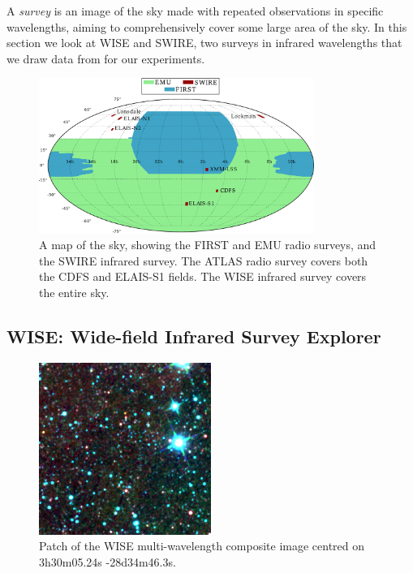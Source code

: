         A \emph{survey} is an image of the sky made with repeated observations
        in specific wavelengths, aiming to comprehensively cover some large area
        of the sky. In this section we look at WISE and SWIRE, two surveys in
        infrared wavelengths that we draw data from for our experiments.

        \begin{figure}
            \centering
            \includegraphics[width=0.8\textwidth]{images/skymap2.pdf}
            \caption{A map of the sky, showing the FIRST and EMU radio surveys,
                and the SWIRE infrared survey. The ATLAS radio survey
                covers both the CDFS and ELAIS-S1 fields. The WISE infrared
                survey covers the entire sky.}
        \end{figure}

        \subsection{WISE: Wide-field Infrared Survey Explorer}
        \label{sec:wise}

            \begin{figure}
                \centering
                \includegraphics[width=0.5\textwidth]
                    {images/WISE_3h30m05.24s-28d34m46.3s.png}
                \caption{Patch of the WISE multi-wavelength composite image
                    centred on 3h30m05.24s -28d34m46.3s.}
                \label{fig:wise}
            \end{figure}

